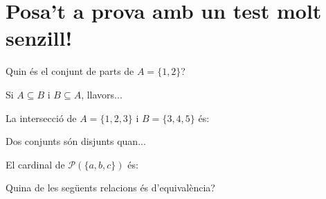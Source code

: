 
\section{Posa't a prova amb un test molt senzill!}

\begin{enumerate}

\pregunta Quin és el conjunt de parts de $A=\{1,2\}$?

\begin{enumerate}
\end{enumerate}
\feedback

\pregunta Si $A\subseteq B$ i $B\subseteq A$, llavors...

\begin{enumerate}
\end{enumerate}
\feedback

\pregunta La intersecció de $A=\{1,2,3\}$ i $B=\{3,4,5\}$ és:

\begin{enumerate}
\end{enumerate}
\feedback

\pregunta Dos conjunts són disjunts quan...

\begin{enumerate}
\end{enumerate}
\feedback

\pregunta El cardinal de $\mathcal{P}(\{a,b,c\})$ és:

\begin{enumerate}
\end{enumerate}
\feedback

\pregunta Quina de les següents relacions és d'equivalència?

\begin{enumerate}
\end{enumerate}
\feedback


\end{enumerate}
